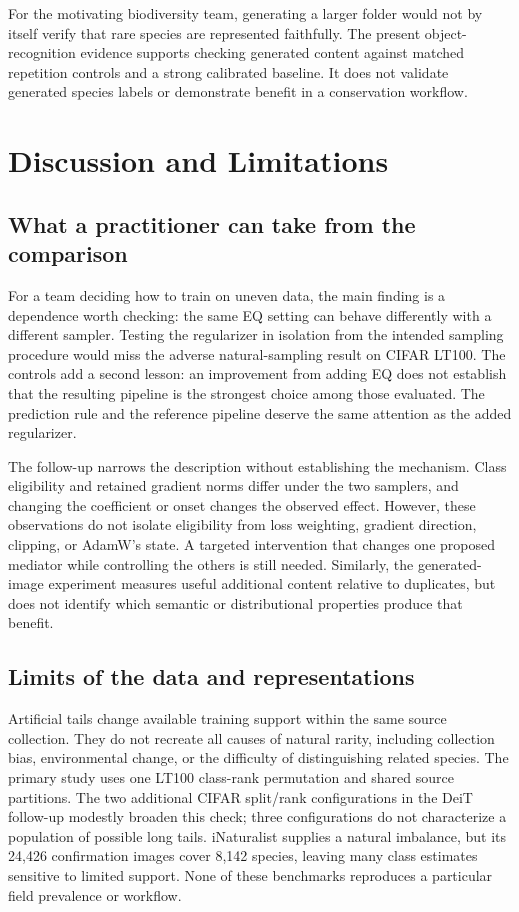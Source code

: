 \documentclass[conference]{IEEEtran}
\begin{document}
For the motivating biodiversity team, generating a larger folder would not by itself verify that rare species are represented faithfully. The present object-recognition evidence supports checking generated content against matched repetition controls and a strong calibrated baseline. It does not validate generated species labels or demonstrate benefit in a conservation workflow.

\section{Discussion and Limitations}
\subsection{What a practitioner can take from the comparison}
For a team deciding how to train on uneven data, the main finding is a dependence worth checking: the same EQ setting can behave differently with a different sampler. Testing the regularizer in isolation from the intended sampling procedure would miss the adverse natural-sampling result on CIFAR LT100. The controls add a second lesson: an improvement from adding EQ does not establish that the resulting pipeline is the strongest choice among those evaluated. The prediction rule and the reference pipeline deserve the same attention as the added regularizer.

The follow-up narrows the description without establishing the mechanism. Class eligibility and retained gradient norms differ under the two samplers, and changing the coefficient or onset changes the observed effect. However, these observations do not isolate eligibility from loss weighting, gradient direction, clipping, or AdamW's state. A targeted intervention that changes one proposed mediator while controlling the others is still needed. Similarly, the generated-image experiment measures useful additional content relative to duplicates, but does not identify which semantic or distributional properties produce that benefit.

\subsection{Limits of the data and representations}
Artificial tails change available training support within the same source collection. They do not recreate all causes of natural rarity, including collection bias, environmental change, or the difficulty of distinguishing related species. The primary study uses one LT100 class-rank permutation and shared source partitions. The two additional CIFAR split/rank configurations in the DeiT follow-up modestly broaden this check; three configurations do not characterize a population of possible long tails. iNaturalist supplies a natural imbalance, but its 24,426 confirmation images cover 8,142 species, leaving many class estimates sensitive to limited support. None of these benchmarks reproduces a particular field prevalence or workflow.
\end{document}
